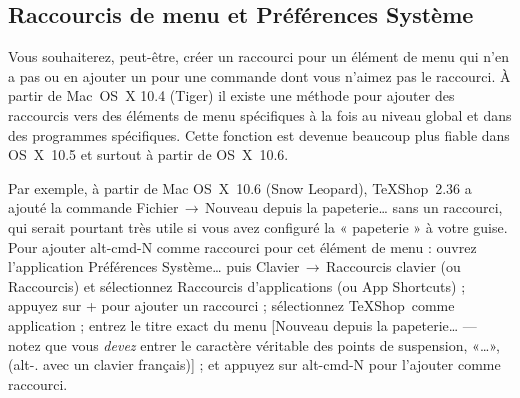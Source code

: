 \documentclass[11pt,french]{article}
\newcommand{\TS}{\textsf{\TeX Shop}}
\newcommand{\cmd}[1]{\textsf{#1}}
\newcommand{\mnu}[1]{\textsf{#1}}
\newcommand{\To}{\,\(\to\)\,}
\begin{document}

\subsection{Raccourcis de menu et Préférences Système}

Vous souhaiterez, peut-être, créer un raccourci pour un élément de menu qui n'en a pas ou en ajouter un pour une commande dont vous n'aimez pas le raccourci. À partir de Mac~OS~X 10.4 (Tiger) il existe une méthode pour ajouter des raccourcis vers des éléments de menu spécifiques à la fois au niveau global et dans des programmes spécifiques. Cette fonction est devenue beaucoup plus fiable dans OS~X~10.5 et surtout à partir de OS~X~10.6.

Par exemple, à partir de Mac OS~X~10.6 (Snow Leopard), \TS\ 2.36 a ajouté la commande \mnu{Fichier}\To\mnu{Nouveau depuis la papeterie…} sans un raccourci, qui serait pourtant très utile si vous avez configuré la « papeterie » à votre guise. Pour ajouter \cmd{alt-cmd-N} comme raccourci pour cet élément de menu : ouvrez l'application \textsf{Préférences Système…} puis \mnu{Clavier}\To\mnu{Raccourcis clavier} (ou \mnu{Raccourcis}) et sélectionnez \mnu{Raccourcis  d'applications} (ou \mnu{App Shortcuts}) ; appuyez sur \mnu{+} pour ajouter un raccourci ; sélectionnez \TS\ comme application ; entrez le titre exact du menu [\mnu{Nouveau depuis la papeterie…} --- notez que vous \emph{devez} entrer le caractère véritable des points de suspension, «…», (\cmd{alt-.} avec un clavier français)] ; et appuyez sur \cmd{alt-cmd-N} pour l'ajouter comme raccourci.

%
\end{document}
